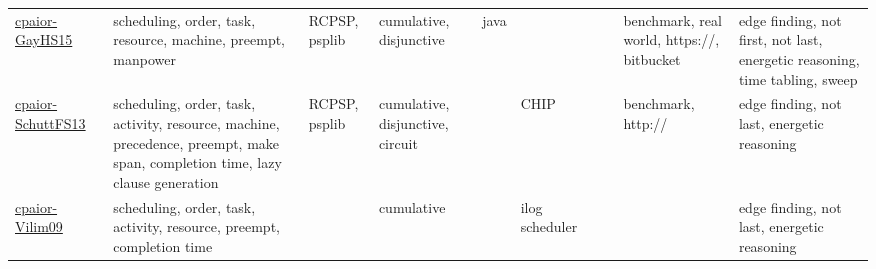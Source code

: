 {\begin{longtable}{p{3cm}p{4cm}p{2cm}p{2cm}p{2cm}p{2cm}p{2cm}p{2cm}p{2cm}p{2cm}}
\href{papers/cpaior-GayHS15.pdf}{cpaior-GayHS15}~\cite{cpaior-GayHS15} & scheduling, order, task, resource, machine, preempt, manpower & RCPSP, psplib & cumulative, disjunctive & java  &  &  &  & benchmark, real world, https://, bitbucket & edge finding, not first, not last, energetic reasoning, time tabling, sweep\\
\href{papers/cpaior-SchuttFS13.pdf}{cpaior-SchuttFS13}~\cite{cpaior-SchuttFS13} & scheduling, order, task, activity, resource, machine, precedence, preempt, make span, completion time, lazy clause generation & RCPSP, psplib & cumulative, disjunctive, circuit &  & CHIP &  &  & benchmark, http:// & edge finding, not last, energetic reasoning\\
\href{papers/cpaior-Vilim09.pdf}{cpaior-Vilim09}~\cite{cpaior-Vilim09} & scheduling, order, task, activity, resource, preempt, completion time &  & cumulative &  & ilog scheduler &  &  &  & edge finding, not last, energetic reasoning\\
\end{longtable}
}


